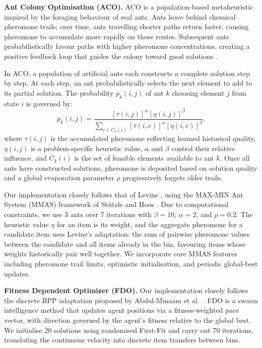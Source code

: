 \documentclass[11pt]{article}
\begin{document}
\textbf{Ant Colony Optimisation (ACO).} ACO is a population-based metaheuristic inspired by the foraging behaviour of real ants. Ants leave behind chemical pheromone trails; over time, ants travelling shorter paths return faster, causing pheromone to accumulate more rapidly on those routes. Subsequent ants probabilistically favour paths with higher pheromone concentrations, creating a positive feedback loop that guides the colony toward good solutions \cite{gendreau}.

In ACO, a population of artificial ants each constructs a complete solution step by step. At each step, an ant probabilistically selects the next element to add to its partial solution. The probability $p_k(i,j)$ of ant $k$ choosing element $j$ from state $i$ is governed by:
$$p_k(i,j) = \frac{[\tau(i,j)]^{\alpha}[\eta(i,j)]^{\beta}}{\sum_{c \in C_k(i)} [\tau(i,c)]^{\alpha} [\eta(i,c)]^{\beta}}.$$
where $\tau(i,j)$ is the accumulated pheromone reflecting learned historical quality, $\eta(i,j)$ is a problem-specific heuristic value, $\alpha$ and $\beta$ control their relative influence, and $C_k(i)$ is the set of feasible elements available to ant $k$. Once all ants have constructed solutions, pheromone is deposited based on solution quality and a global evaporation parameter $\rho$ progressively forgets older trails.

Our implementation closely follows that of Levine \cite{levine}, using the MAX-MIN Ant System (MMAS) framework of St\"utzle and Hoos \cite{stuetzle}. Due to computational constraints, we use 3 ants over 7 iterations with $\beta = 10$, $\alpha = 2$, and $\rho = 0.2$. The heuristic value $\eta$ for an item is its weight, and the aggregate pheromone for a candidate item uses Levine's adaptation: the sum of pairwise pheromone values between the candidate and all items already in the bin, favouring items whose weights historically pair well together. We incorporate core MMAS features including pheromone trail limits, optimistic initialisation, and periodic global-best updates.

\textbf{Fitness Dependent Optimizer (FDO).} Our implementation closely follows the discrete BPP adaptation proposed by Abdul-Minaam et al.\ \cite{abdulminaam}. FDO is a swarm intelligence method that updates agent positions via a fitness-weighted pace vector, with direction governed by the agent's fitness relative to the global best. We initialise 20 solutions using randomised First-Fit and carry out 70 iterations, translating the continuous velocity into discrete item transfers between bins.
\end{document}
